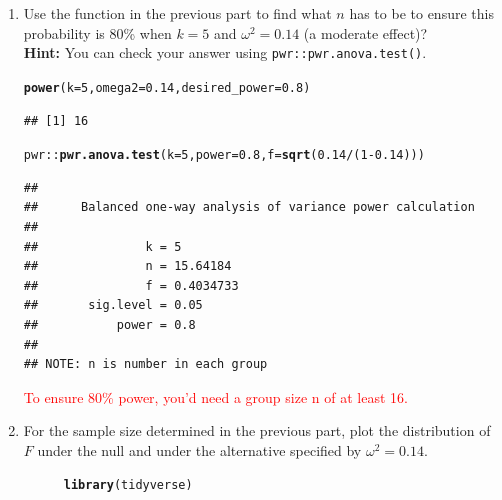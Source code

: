 \documentclass{article}\usepackage[]{graphicx}\usepackage[]{xcolor}
\makeatletter
\newcommand{\hlnum}[1]{\textcolor[rgb]{0.686,0.059,0.569}{#1}}%
\newcommand{\hlopt}[1]{\textcolor[rgb]{0,0,0}{#1}}%
\newcommand{\hldef}[1]{\textcolor[rgb]{0.345,0.345,0.345}{#1}}%
\newcommand{\hlkwc}[1]{\textcolor[rgb]{0.333,0.667,0.333}{#1}}%
\newcommand{\hlkwd}[1]{\textcolor[rgb]{0.737,0.353,0.396}{\textbf{#1}}}%
\newenvironment{kframe}{%
 \def\at@end@of@kframe{}%
 \ifinner\ifhmode%
  \def\at@end@of@kframe{\end{minipage}}%
  \begin{minipage}{\columnwidth}%
 \fi\fi%
 \def\FrameCommand##1{\hskip\@totalleftmargin \hskip-\fboxsep
 \colorbox{shadecolor}{##1}\hskip-\fboxsep
     \hskip-\linewidth \hskip-\@totalleftmargin \hskip\columnwidth}%
 \MakeFramed {\advance\hsize-\width
   \@totalleftmargin\z@ \linewidth\hsize
   \@setminipage}}%
 {\par\unskip\endMakeFramed%
 \at@end@of@kframe}
\newenvironment{knitrout}{}{} %
\makeatother
\begin{document}
\begin{enumerate}
\begin{enumerate}
\begin{knitrout}
\begin{kframe}
\begin{alltt}
  \hldef{\}}
\hldef{\}}
\end{alltt}
\end{kframe}
\end{knitrout}

\item Use the function in the previous part to find what $n$ has to be to 
ensure this probability is 80\% when $k=5$ and $\omega^2=0.14$ (a moderate 
effect)?\\
\textbf{Hint:} You can check your answer using \texttt{pwr::pwr.anova.test()}.

\begin{knitrout}\scriptsize
{}\color{fgcolor}\begin{kframe}
\begin{alltt}
\hlkwd{power}\hldef{(}\hlkwc{k} \hldef{=} \hlnum{5}\hldef{,} \hlkwc{omega2} \hldef{=} \hlnum{0.14}\hldef{,} \hlkwc{desired_power} \hldef{=} \hlnum{0.8}\hldef{)}
\end{alltt}
\begin{verbatim}
## [1] 16
\end{verbatim}
\begin{alltt}
\hldef{pwr}\hlopt{::}\hlkwd{pwr.anova.test}\hldef{(}\hlkwc{k} \hldef{=} \hlnum{5}\hldef{,} \hlkwc{power} \hldef{=} \hlnum{0.8}\hldef{,} \hlkwc{f} \hldef{=} \hlkwd{sqrt}\hldef{(}\hlnum{0.14}\hlopt{/}\hldef{(}\hlnum{1}\hlopt{-}\hlnum{0.14}\hldef{)))}
\end{alltt}
\begin{verbatim}
## 
##      Balanced one-way analysis of variance power calculation 
## 
##               k = 5
##               n = 15.64184
##               f = 0.4034733
##       sig.level = 0.05
##           power = 0.8
## 
## NOTE: n is number in each group
\end{verbatim}
\end{kframe}
\end{knitrout}

\textcolor{red}{To ensure 80\% power, you'd need a group size n of at least 16.}

\item For the sample size determined in the previous part, plot the 
distribution of $F$ under the null and under the alternative specified 
by $\omega^2=0.14$.

\begin{figure}[H]

\begin{knitrout}\scriptsize
{}\color{fgcolor}\begin{kframe}
\begin{alltt}
\hlkwd{library}\hldef{(tidyverse)}


\end{alltt}
\end{kframe}
\end{knitrout}
\end{figure}
\end{enumerate}
\end{enumerate}
\end{document}
